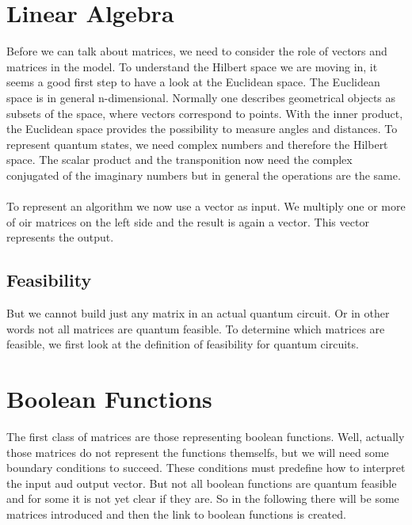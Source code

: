 \documentclass[oneside]{thesisclass}
\begin{document}
\chapter{Linear Algebra}

Before we can talk about matrices, we need to consider the role of vectors and matrices in the model.
To understand the Hilbert space we are moving in, it seems a good first step to have a look at the Euclidean space.
The Euclidean space is in general n-dimensional.
Normally one describes geometrical objects as subsets of the space, where vectors correspond to points.
With the inner product, the Euclidean space provides the possibility to measure angles and distances.
To represent quantum states, we need complex numbers and therefore the Hilbert space.
The scalar product and the transponition now need the complex conjugated of the imaginary numbers but in general the operations are the same.\\
\\To represent an algorithm we now use a vector as input.
We multiply one or more of oir matrices on the left side and the result is again a vector.
This vector represents the output.

\section{Feasibility}
But we cannot build just any matrix in an actual quantum circuit.
Or in other words not all matrices are quantum feasible.
To determine which matrices are feasible, we first look at the definition of feasibility for quantum circuits.

\chapter{Boolean Functions}
The first class of matrices are those representing boolean functions.
Well, actually those matrices do not represent the functions themselfs, but we will need some boundary conditions to succeed.
These conditions must predefine how to interpret the input aud output vector.
But not all boolean functions are quantum feasible and for some it is not yet clear if they are.
So in the following there will be some matrices introduced and then the link to boolean functions is created.
\end{document}
